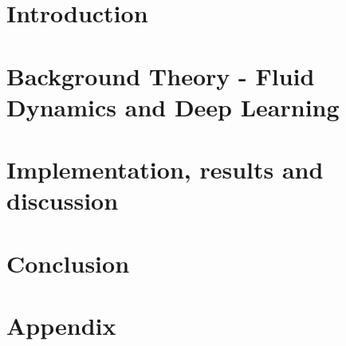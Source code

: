 
\addtolength{\evensidemargin}{-12mm}

%
%
\part[Introduction]{Introduction}
\label{part:Intro}


\part[Theory]{Background Theory - Fluid Dynamics and Deep Learning}
\label{part:Theory}


\part[Methodology]{Implementation, results and discussion}
\label{part:Method}



% 
\part[Conclusion]{Conclusion}
\label{part:Conclusion}

%
%
\part*{Appendix}

\appendix %


